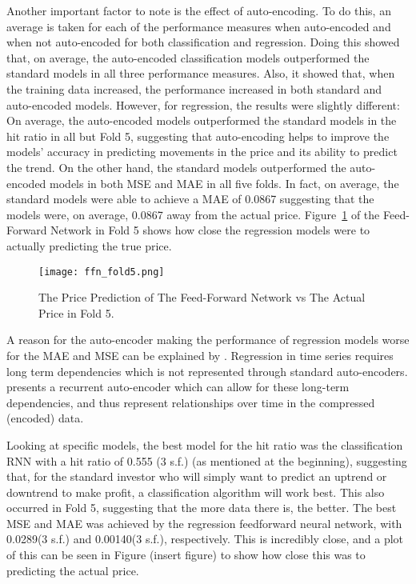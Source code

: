 \documentclass[11pt,a4paper]{article}
\numberwithin{equation}{section}
\begin{document}
Another important factor to note is the effect of auto-encoding. To do this, an average is taken for each of the performance measures when auto-encoded and when not auto-encoded for both classification and regression. Doing this showed that, on average, the auto-encoded classification models outperformed the standard models in all three performance measures. Also, it showed that, when the training data increased, the performance increased in both standard and auto-encoded models. However, for regression, the results were slightly different: On average, the auto-encoded models outperformed the standard models in the hit ratio in all but Fold 5, suggesting that auto-encoding helps to improve the models’ accuracy in predicting movements in the price and its ability to predict the trend. On the other hand, the standard models outperformed the auto-encoded models in both MSE and MAE in all five folds. In fact, on average, the standard models were able to achieve a MAE of 0.0867 suggesting that the models were, on average, 0.0867 away from the actual price. Figure~\ref{f:ffnfold5} of the Feed-Forward Network in Fold 5 shows how close the regression models were to actually predicting the true price.

\begin{figure}
\begin{center}
\texttt{[image: ffn\_fold5.png]}
\end{center}
\caption{The Price Prediction of The Feed-Forward Network vs The Actual Price in Fold 5.}
\label{f:ffnfold5}
\end{figure}

A reason for the auto-encoder making the performance of regression models worse for the MAE and MSE can be explained by \cite{maas2009}. Regression in time series requires long term dependencies which is not represented through standard auto-encoders. \cite{maas2009} presents a recurrent auto-encoder which can allow for these long-term dependencies, and thus represent relationships over time in the compressed (encoded) data.

Looking at specific models, the best model for the hit ratio was the classification RNN with a hit ratio of 0.555 (3 s.f.) (as mentioned at the beginning), suggesting that, for the standard investor who will simply want to predict an uptrend or downtrend to make profit, a classification algorithm will work best. This also occurred in Fold 5, suggesting that the more data there is, the better. The best MSE and MAE was achieved by the regression feedforward neural network, with 0.0289(3 s.f.) and 0.00140(3 s.f.), respectively. This is incredibly close, and a plot of this can be seen in Figure (insert figure) to show how close this was to predicting the actual price.
\end{document}
